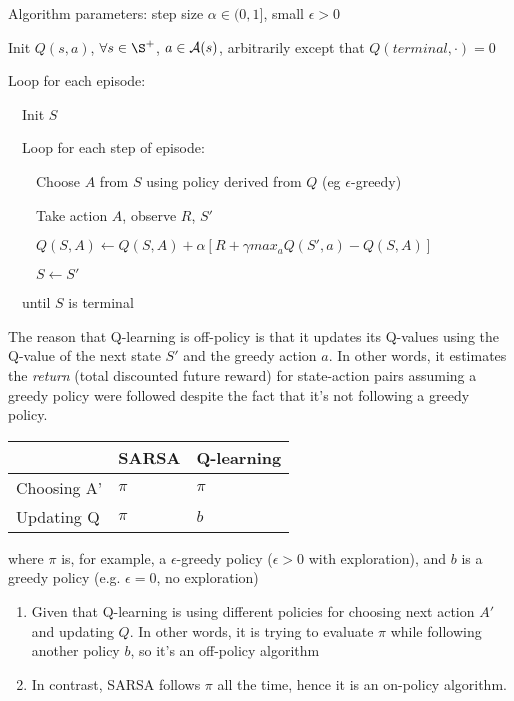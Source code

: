 \documentclass[sutton_barto_notes.tex]{subfiles}
\begin{document}
\begin{tcolorbox}[width=1.1\textwidth,title={Q-learning (off-policy TD control) for estimating $\pi\approx \pi_*$}]
Algorithm parameters: step size $\alpha \in (0,1]$, small $\epsilon > 0$

Init $Q(s,a)$, $\forall s \in \S^+$, $a \in \operatorname*{\mathcal{A}}(s)$, arbitrarily except that $Q(terminal,\cdot)=0$

Loop for each episode:

$\quad$Init $S$

$\quad$Loop for each step of episode:

$\quad\quad$Choose $A$ from $S$ using policy derived from $Q$ (eg $\epsilon$-greedy)

$\quad\quad$Take action $A$, observe $R$, $S'$

$\quad\quad Q(S, A) \leftarrow Q(S, A) + \alpha [ R + \gamma max_a Q( S', a) - Q(S, A)]$

$\quad\quad S \leftarrow S'$

$\quad$until $S$ is terminal
\end{tcolorbox}

The reason that Q-learning is off-policy is that it updates its Q-values using the Q-value of the next state $S'$ and the greedy action $a$. In other words, it estimates the \textit{return} (total discounted future reward) for state-action pairs assuming a greedy policy were followed despite the fact that it's not following a greedy policy.


\begin{table}[h!]
\begin{tabular}{lll}
            & SARSA              & Q-learning         \\ \hline
Choosing A' & $\pi$ & $\pi$ \\ \hline
Updating Q  & $\pi$ & $b$    \\ \hline             
\end{tabular}
\end{table}
where $\pi$ is, for example, a $\epsilon$-greedy policy ($\epsilon > 0$ with exploration), and $b$ is a greedy policy (e.g. $\epsilon = 0$, no exploration)

\begin{enumerate}
\item Given that Q-learning is using different policies for choosing next action $A'$ and updating $Q$. In other words, it is trying to evaluate $\pi$ while following another policy $b$, so it's an off-policy algorithm
\item In contrast, SARSA follows $\pi$ all the time, hence it is an on-policy algorithm.
\end{enumerate}
\end{document}
